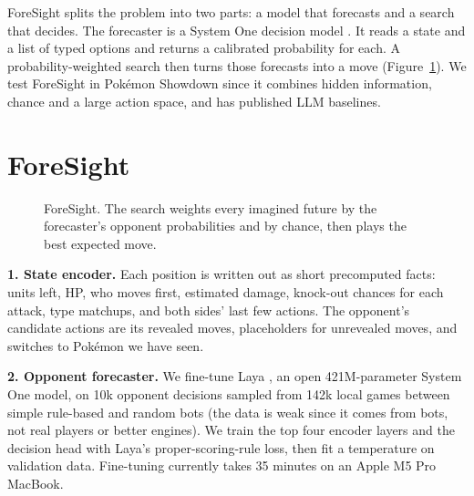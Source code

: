 \documentclass[letterpaper]{article} %
\begin{document}
ForeSight splits the problem into two parts: a model that forecasts and a search that decides. The forecaster is a System One decision model \citep{jev,laya}. It reads a state and a list of typed options and returns a calibrated probability for each. A probability-weighted search then turns those forecasts into a move (Figure~\ref{fig:overview}). We test ForeSight in Pok\'emon Showdown since it combines hidden information, chance and a large action space, and has published LLM baselines.

\section{ForeSight}
\begin{figure}[t]
\centering
{}
\caption{ForeSight. The search weights every imagined future by the forecaster's opponent probabilities and by chance, then plays the best expected move.}
\label{fig:overview}
\end{figure}

\textbf{1. State encoder.} Each position is written out as short precomputed facts: units left, HP, who moves first, estimated damage, knock-out chances for each attack, type matchups, and both sides' last few actions. The opponent's candidate actions are its revealed moves, placeholders for unrevealed moves, and switches to Pok\'emon we have seen.

\textbf{2. Opponent forecaster.} We fine-tune Laya \citep{laya}, an open 421M-parameter System One model, on 10k opponent decisions sampled from 142k local games between simple rule-based and random bots (the data is weak since it comes from bots, not real players or better engines). We train the top four encoder layers and the decision head with Laya's proper-scoring-rule loss, then fit a temperature on validation data. Fine-tuning currently takes 35 minutes on an Apple M5 Pro MacBook.
\end{document}
